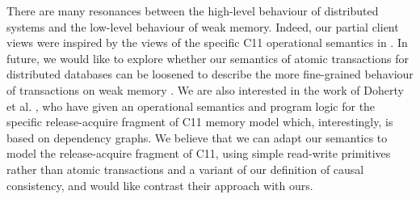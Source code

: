 There are many resonances between the high-level  behaviour
of distributed systems and the low-level behaviour  of weak
memory. Indeed, our partial client views were 
inspired by the views of  the specific C11 operational semantics
in \cite{promises}. In future, we would like to explore whether our semantics 
of atomic transactions for distributed databases can be loosened to
describe the more fine-grained behaviour of transactions on weak
memory \cite{PSI-RA,DBLP:conf/pldi/ChongSW18}. We are also interested in the
work of 
Doherty et al. \citet{op-semantics-c11-rar}, who have given  an
operational semantics and program logic
for the specific release-acquire fragment of C11 memory model which, interestingly, 
is based on dependency graphs. We believe that we can adapt our
semantics to 
model the release-acquire fragment of C11, using simple read-write
primitives rather than atomic transactions and 
 a variant of our definition of causal consistency, and would like 
contrast their approach with ours. 
